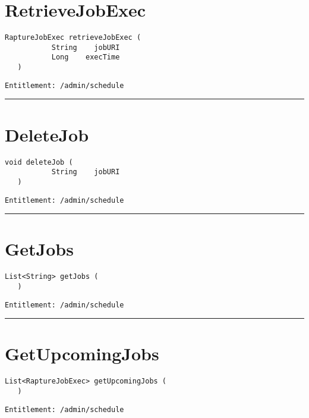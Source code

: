 \section{RetrieveJobExec}
\label{Api:RetrieveJobExec}
\begin{lstlisting}[style=nonumbers]
   RaptureJobExec retrieveJobExec (
           String    jobURI
           Long    execTime
   )
\end{lstlisting}
\begin{Verbatim}[formatcom=\color{Maroon}]
  Entitlement: /admin/schedule
\end{Verbatim}



\rule{12cm}{2pt}
\section{DeleteJob}
\label{Api:DeleteJob}
\begin{lstlisting}[style=nonumbers]
   void deleteJob (
           String    jobURI
   )
\end{lstlisting}
\begin{Verbatim}[formatcom=\color{Maroon}]
  Entitlement: /admin/schedule
\end{Verbatim}



\rule{12cm}{2pt}
\section{GetJobs}
\label{Api:GetJobs}
\begin{lstlisting}[style=nonumbers]
   List<String> getJobs (
   )
\end{lstlisting}
\begin{Verbatim}[formatcom=\color{Maroon}]
  Entitlement: /admin/schedule
\end{Verbatim}



\rule{12cm}{2pt}
\section{GetUpcomingJobs}
\label{Api:GetUpcomingJobs}
\begin{lstlisting}[style=nonumbers]
   List<RaptureJobExec> getUpcomingJobs (
   )
\end{lstlisting}
\begin{Verbatim}[formatcom=\color{Maroon}]
  Entitlement: /admin/schedule
\end{Verbatim}



